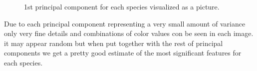 \documentclass[11pt]{article}
\begin{document}
\begin{singlespace}
\begin{enumerate}
\begin{figure}[h]
    \centering
    
    
    \caption{1st principal component for each species visualized as a picture.}
\end{figure}

Due to each principal component representing a very small amount of variance only very fine details and combinations of color values con be seen in each image. it may appear random but when put together with the rest of principal components we get a pretty good estimate of the most significant features for each species.\\



\end{enumerate}
\end{singlespace}
\end{document}
